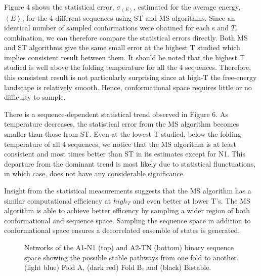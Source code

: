 \documentclass[%
 aip,
rsi,%
 amsmath,amssymb,
 reprint,%
]{revtex4-1}
\newcommand {\sigE}	{{\sigma_{\left < E \right >}}}
\begin{document}
Figure 4 shows the statistical error, $\sigE$, estimated for the average energy, $\left <E\right >$, for the 4 different sequences using ST and MS algorithms. Since an identical number of sampled conformations were obatined for each s and $T_i$ combination, we can therefore compare the statistical errors directly. Both MS and ST algorithms give the same small error at the highest T studied which implies consistent result between them. It should be noted that the highest T studied is well above the folding temperature for all the 4 sequences. Therefore, this consistent result is not particularly surprising since at high-T the free-energy landscape is relatively smooth. Hence, conformational space requires little or no difficulty to sample.

There is a sequence-dependent statistical trend observed in Figure 6. As temperature decreases, the statistical error from the MS algorithm becomes smaller than those from ST. Even at the lowest T studied, below the folding temperature of all 4 sequences, we notice that the MS algorithm is at least consistent and most times better than ST in its estimates except for N1. This departure from the dominant trend is most likely due to statistical flunctuations, in which case, does not have any considerable significance.

Insight from the statistical measurements suggests that the MS algorithm has a similar computational efficiency at $high_T$ and even better at lower T's. The MS algorithm is able to achieve  better efficency by sampling a wider region of both conformational and sequence space. Sampling the sequence space in addition to conformational space ensures a decorrelated ensemble of states is generated.

\begin{figure}
\caption{Networks of the A1-N1 (top) and A2-TN (bottom) binary sequence space showing the possible stable pathways from one fold to another. (light blue) Fold A, (dark red) Fold B, and (black) Bistable. }
\end{figure}
\end{document}
